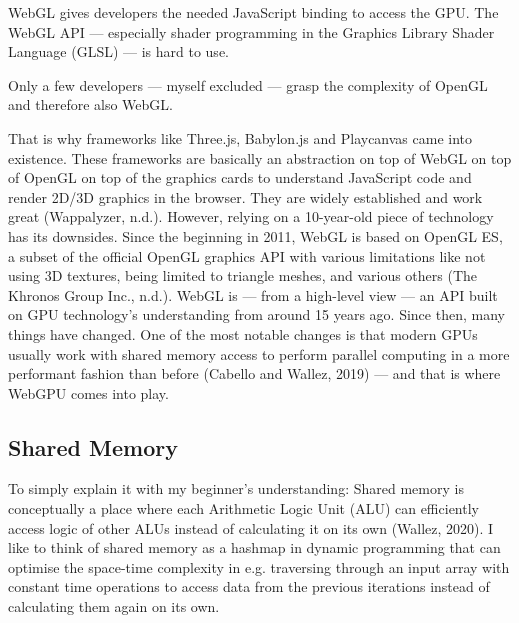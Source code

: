 \documentclass[10pt]{article}
\begin{document}
\begin{sloppypar}
  WebGL gives developers the needed JavaScript binding to access the GPU. The WebGL API — especially shader programming in the Graphics Library Shader Language (GLSL) — is hard to use.

  Only a few developers — myself excluded — grasp the complexity of OpenGL and therefore also WebGL.

  That is why frameworks like Three.js, Babylon.js and Playcanvas came into existence. These frameworks are basically an abstraction on top of WebGL on top of OpenGL on top of the graphics cards to understand JavaScript code and render 2D/3D graphics in the browser. They are widely established and work great (Wappalyzer, n.d.). However, relying on a 10-year-old piece of technology has its downsides. Since the beginning in 2011, WebGL is based on OpenGL ES, a subset of the official OpenGL graphics API with various limitations like not using 3D textures, being limited to triangle meshes, and various others (The Khronos Group Inc., n.d.). WebGL is — from a high-level view — an API built on GPU technology’s understanding from around 15 years ago. Since then, many things have changed. One of the most notable changes is that modern GPUs usually work with shared memory access to perform parallel computing in a more performant fashion than before (Cabello and Wallez, 2019) — and that is where WebGPU comes into play.

  \subsection{Shared Memory}
  \label{subsec:shared-memory}

  To simply explain it with my beginner’s understanding: Shared memory is conceptually a place where each Arithmetic Logic Unit (ALU) can efficiently access logic of other ALUs instead of calculating it on its own (Wallez, 2020). I like to think of shared memory as a hashmap in dynamic programming that can optimise the space-time complexity in e.g. traversing through an input array with constant time operations to access data from the previous iterations instead of calculating them again on its own.


\end{sloppypar}
\end{document}
